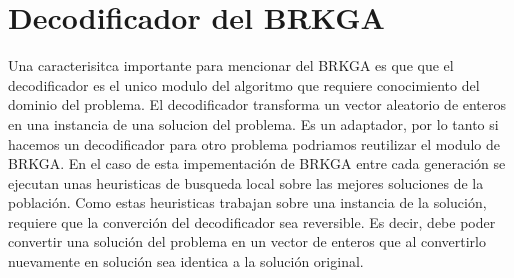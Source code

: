 \section{Decodificador del BRKGA}

Una caracterisitca importante para mencionar del BRKGA es que que el decodificador es el unico modulo del algoritmo que requiere conocimiento del dominio del problema. El decodificador transforma un vector aleatorio de enteros en una instancia de una solucion del problema. Es un adaptador, por lo tanto si hacemos un decodificador para otro problema podriamos reutilizar el modulo de BRKGA.
En el caso de esta impementación de BRKGA entre cada generación se ejecutan unas heuristicas de busqueda local sobre las mejores soluciones de la población. Como estas heuristicas trabajan sobre una instancia de la solución, requiere que la converción del decodificador sea reversible. Es decir, debe poder convertir una solución del problema en un vector de enteros que al convertirlo nuevamente en solución sea identica a la solución original. 

